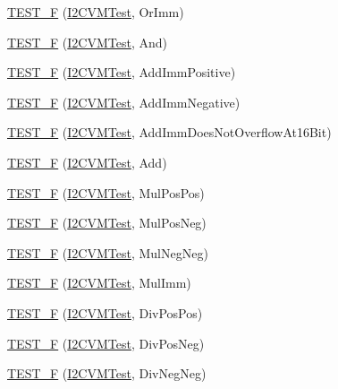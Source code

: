 \begin{DoxyCompactItemize}
\item 
\hyperlink{group___unit_tests_gaab9d848ac09c9188a76aefedde95f0d9}{T\-E\-S\-T\-\_\-\-F} (\hyperlink{class_i2_c_v_m_test}{I2\-C\-V\-M\-Test}, Or\-Imm)
\item 
\hyperlink{group___unit_tests_gadef92e19394b5187e64aa9673b4a12ed}{T\-E\-S\-T\-\_\-\-F} (\hyperlink{class_i2_c_v_m_test}{I2\-C\-V\-M\-Test}, And)
\item 
\hyperlink{group___unit_tests_ga0d9ace46337e18e51615a40e0aa8d829}{T\-E\-S\-T\-\_\-\-F} (\hyperlink{class_i2_c_v_m_test}{I2\-C\-V\-M\-Test}, Add\-Imm\-Positive)
\item 
\hyperlink{group___unit_tests_gad8c282d88cb4f0088a9a4119db2cd1e8}{T\-E\-S\-T\-\_\-\-F} (\hyperlink{class_i2_c_v_m_test}{I2\-C\-V\-M\-Test}, Add\-Imm\-Negative)
\item 
\hyperlink{group___unit_tests_ga9829ebf2ae65488e6ccf160935366f67}{T\-E\-S\-T\-\_\-\-F} (\hyperlink{class_i2_c_v_m_test}{I2\-C\-V\-M\-Test}, Add\-Imm\-Does\-Not\-Overflow\-At16\-Bit)
\item 
\hyperlink{group___unit_tests_ga5b89dd714658a53cd8aac63b369eb4d6}{T\-E\-S\-T\-\_\-\-F} (\hyperlink{class_i2_c_v_m_test}{I2\-C\-V\-M\-Test}, Add)
\item 
\hyperlink{group___unit_tests_gacce37e91388f64c77a7639840f41ec16}{T\-E\-S\-T\-\_\-\-F} (\hyperlink{class_i2_c_v_m_test}{I2\-C\-V\-M\-Test}, Mul\-Pos\-Pos)
\item 
\hyperlink{group___unit_tests_ga894251de250d7fca8fa49e2777bf1d14}{T\-E\-S\-T\-\_\-\-F} (\hyperlink{class_i2_c_v_m_test}{I2\-C\-V\-M\-Test}, Mul\-Pos\-Neg)
\item 
\hyperlink{group___unit_tests_gad5b94d4470f9d8171e7e6e2b13e15f74}{T\-E\-S\-T\-\_\-\-F} (\hyperlink{class_i2_c_v_m_test}{I2\-C\-V\-M\-Test}, Mul\-Neg\-Neg)
\item 
\hyperlink{group___unit_tests_gab41e406d8e82ae50d4f4e996fc61aa23}{T\-E\-S\-T\-\_\-\-F} (\hyperlink{class_i2_c_v_m_test}{I2\-C\-V\-M\-Test}, Mul\-Imm)
\item 
\hyperlink{group___unit_tests_gae742693ab9cdf6d9aa60587eecd23cc3}{T\-E\-S\-T\-\_\-\-F} (\hyperlink{class_i2_c_v_m_test}{I2\-C\-V\-M\-Test}, Div\-Pos\-Pos)
\item 
\hyperlink{group___unit_tests_gada8a4a6bad23c5bbd0bfb9f7081db885}{T\-E\-S\-T\-\_\-\-F} (\hyperlink{class_i2_c_v_m_test}{I2\-C\-V\-M\-Test}, Div\-Pos\-Neg)
\item 
\hyperlink{group___unit_tests_ga4c34c8b941370225deb56e1abddc0c6c}{T\-E\-S\-T\-\_\-\-F} (\hyperlink{class_i2_c_v_m_test}{I2\-C\-V\-M\-Test}, Div\-Neg\-Neg)

\end{DoxyCompactItemize}
